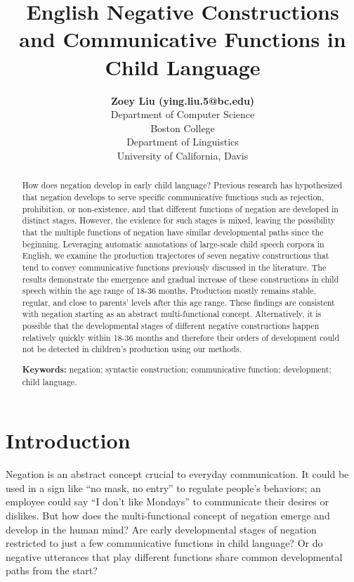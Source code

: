 \documentclass[10pt, letterpaper]{article}
\title{English Negative Constructions and Communicative Functions in Child
Language}
\author{{\large \bf Zoey Liu (ying.liu.5@bc.edu)} \\ Department of Computer Science \\ Boston College \AND {\large \bf Masoud Jasbi (jasbi@ucdavis.edu)} \\ Department of Linguistics \\ University of California, Davis}
\begin{document}
\maketitle

\begin{abstract}
How does negation develop in early child language? Previous research has
hypothesized that negation develops to serve specific communicative
functions such as rejection, prohibition, or non-existence, and that
different functions of negation are developed in distinct stages.
However, the evidence for such stages is mixed, leaving the possibility
that the multiple functions of negation have similar developmental paths
since the beginning. Leveraging automatic annotations of large-scale
child speech corpora in English, we examine the production trajectores
of seven negative constructions that tend to convey communicative
functions previously discussed in the literature. The results
demonstrate the emergence and gradual increase of these constructions in
child speech within the age range of 18-36 months. Production mostly
remains stable, regular, and close to parents' levels after this age
range. These findings are consistent with negation starting as an
abstract multi-functional concept. Alternatively, it is possible that
the developmental stages of different negative constructions happen
relatively quickly within 18-36 months and therefore their orders of
development could not be detected in children's production using our
methods.

\textbf{Keywords:}
negation; syntactic construction; communicative function; development;
child language.
\end{abstract}

\hypertarget{introduction}{%
\section{Introduction}\label{introduction}}

Negation is an abstract concept crucial to everyday communication. It
could be used in a sign like ``no mask, no entry'' to regulate people's
behaviors; an employee could say ``I don't like Mondays'' to communicate
their desires or dislikes. But how does the multi-functional concept of
negation emerge and develop in the human mind? Are early developmental
stages of negation restricted to just a few communicative functions in
child language? Or do negative utterances that play different functions
share common developmental paths from the start?
\end{document}
